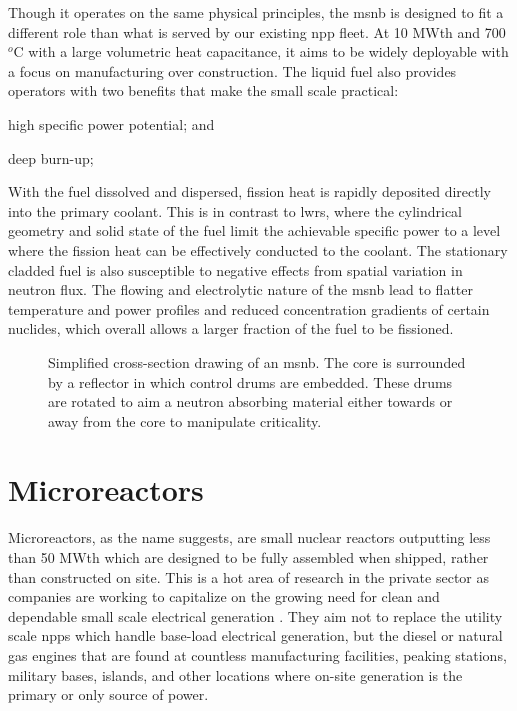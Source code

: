 Though it operates on the same physical principles, the \acs{msnb} is designed to fit a different role than what is served by our existing \acf{npp} fleet. At 10 MWth and 700 $^o$C with a large volumetric heat capacitance, it aims to be widely deployable with a focus on manufacturing over construction. The liquid fuel also provides operators with two benefits that make the small scale practical:
\begin{enumerate*}
    \item high specific power potential; and
    \item deep burn-up;
\end{enumerate*}

With the fuel dissolved and dispersed, fission heat is rapidly deposited directly into the primary coolant. This is in contrast to \acfp{lwr}, where the cylindrical geometry and solid state of the fuel limit the achievable specific power 
to a level where the fission heat can be effectively conducted to the coolant. The stationary cladded fuel is also susceptible to negative effects from spatial variation in neutron flux. The flowing and electrolytic nature of the \acs{msnb} lead to flatter temperature and power profiles and reduced concentration gradients of certain nuclides, which overall allows a larger fraction of the fuel to be fissioned.

\begin{figure}[!ht]
    \centering
    
    \caption[Simplified cross-section drawing of an \acs{msnb}]{Simplified cross-section drawing of an \acs{msnb}. The core is surrounded by a reflector in which control drums are embedded. These drums are rotated to aim a neutron absorbing material either towards or away from the core to manipulate criticality.}
    \label{fig:tikz_drum}
\end{figure}

\section{Microreactors}
Microreactors, as the name suggests, are small nuclear reactors outputting less than 50 MWth which are designed to be fully assembled when shipped, rather than constructed on site. This is a hot area of research in the private sector as companies are working to capitalize on the growing need for clean and dependable small scale electrical generation \cite{PetersonMS}. They aim not to replace the utility scale \acsp{npp} which handle base-load electrical generation, but the diesel or natural gas engines that are found at countless manufacturing facilities, peaking stations, military bases, islands, and other locations where on-site generation is the primary or only source of power. 


